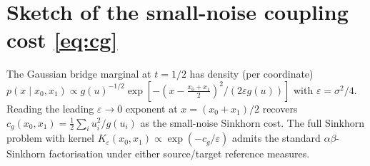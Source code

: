 \documentclass[11pt]{article}
\begin{document}
\section{Sketch of the small-noise coupling cost \eqref{eq:cg}}
\label{app:cost}

The Gaussian bridge marginal at $t=1/2$ has density (per coordinate)
$p(x\mid x_0, x_1) \propto g(u)^{-1/2}\exp[-(x - \tfrac{x_0+x_1}{2})^2/(2\varepsilon g(u))]$
with $\varepsilon = \sigma^2/4$. Reading the leading $\varepsilon\to 0$
exponent at $x = (x_0+x_1)/2$ recovers
$c_g(x_0, x_1) = \tfrac{1}{2}\sum_i u_i^2/g(u_i)$ as the small-noise
Sinkhorn cost. The full Sinkhorn problem with kernel
$K_\varepsilon(x_0,x_1)\propto\exp(-c_g/\varepsilon)$ admits the standard
$\alpha\beta$-Sinkhorn factorisation under either source/target
reference measures.
\end{document}
